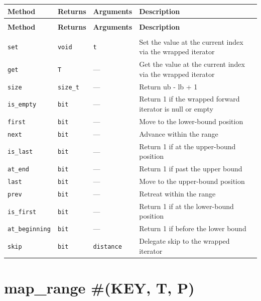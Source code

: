 \documentclass[11pt,letterpaper]{report}
\begin{document}
\begin{xltabular}{\linewidth}{>{\small}p{1.35in} >{\small}p{1.25in} >{\small}p{0.95in} >{\small}X}
\toprule
\textbf{Method} & \textbf{Returns} & \textbf{Arguments} & \textbf{Description} \\
\midrule
\endfirsthead
{} \\
\midrule
\textbf{Method} & \textbf{Returns} & \textbf{Arguments} & \textbf{Description} \\
\midrule
\endhead
\midrule
{} \\
\endfoot
\bottomrule
\endlastfoot
\texttt{set} & \texttt{void} & \texttt{t} & Set the value at the current index via the wrapped iterator \\
\texttt{get} & \texttt{T} & --- & Get the value at the current index via the wrapped iterator \\
\texttt{size} & \texttt{size\_t} & --- & Return ub - lb + 1 \\
\texttt{is\_empty} & \texttt{bit} & --- & Return 1 if the wrapped forward iterator is null or empty \\
\texttt{first} & \texttt{bit} & --- & Move to the lower-bound position \\
\texttt{next} & \texttt{bit} & --- & Advance within the range \\
\texttt{is\_last} & \texttt{bit} & --- & Return 1 if at the upper-bound position \\
\texttt{at\_end} & \texttt{bit} & --- & Return 1 if past the upper bound \\
\texttt{last} & \texttt{bit} & --- & Move to the upper-bound position \\
\texttt{prev} & \texttt{bit} & --- & Retreat within the range \\
\texttt{is\_first} & \texttt{bit} & --- & Return 1 if at the lower-bound position \\
\texttt{at\_beginning} & \texttt{bit} & --- & Return 1 if before the lower bound \\
\texttt{skip} & \texttt{bit} & \texttt{distance} & Delegate skip to the wrapped iterator \\
\end{xltabular}

\section{map\_range \#(KEY, T, P)}
\label{cls:maprangeKEYTP}
\end{document}

